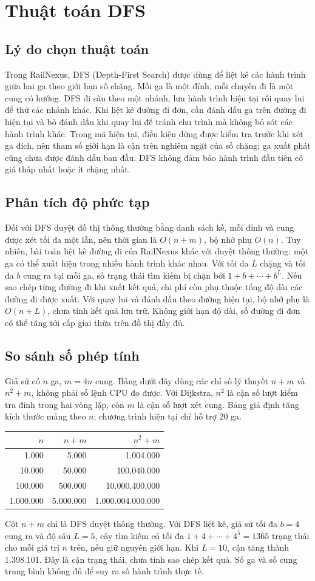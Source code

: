 \chapter{Thuật toán DFS}
\section{Lý do chọn thuật toán}
Trong RailNexus, DFS (Depth-First Search) được dùng để liệt kê các hành trình giữa hai ga theo giới hạn số chặng. Mỗi ga là một đỉnh, mỗi chuyến đi là một cung có hướng. DFS đi sâu theo một nhánh, lưu hành trình hiện tại rồi quay lui để thử các nhánh khác. Khi liệt kê đường đi đơn, cần đánh dấu ga trên đường đi hiện tại và bỏ đánh dấu khi quay lui để tránh chu trình mà không bỏ sót các hành trình khác. Trong mã hiện tại, điều kiện dừng được kiểm tra trước khi xét ga đích, nên tham số giới hạn là cận trên nghiêm ngặt của số chặng; ga xuất phát cũng chưa được đánh dấu ban đầu. DFS không đảm bảo hành trình đầu tiên có giá thấp nhất hoặc ít chặng nhất.
\section{Phân tích độ phức tạp}
Đối với DFS duyệt đồ thị thông thường bằng danh sách kề, mỗi đỉnh và cung được xét tối đa một lần, nên thời gian là $O(n+m)$, bộ nhớ phụ $O(n)$. Tuy nhiên, bài toán liệt kê đường đi của RailNexus khác với duyệt thông thường: một ga có thể xuất hiện trong nhiều hành trình khác nhau. Với tối đa $L$ chặng và tối đa $b$ cung ra tại mỗi ga, số trạng thái tìm kiếm bị chặn bởi $1+b+\cdots+b^L$. Nếu sao chép từng đường đi khi xuất kết quả, chi phí còn phụ thuộc tổng độ dài các đường đi được xuất. Với quay lui và đánh dấu theo đường hiện tại, bộ nhớ phụ là $O(n+L)$, chưa tính kết quả lưu trữ. Không giới hạn độ dài, số đường đi đơn có thể tăng tới cấp giai thừa trên đồ thị đầy đủ.
\section{So sánh số phép tính}
Giả sử có $n$ ga, $m=4n$ cung. Bảng dưới đây dùng các chỉ số lý thuyết $n+m$ và $n^2+m$, không phải số lệnh CPU đo được. Với Dijkstra, $n^2$ là cận số lượt kiểm tra đỉnh trong hai vòng lặp, còn $m$ là cận số lượt xét cung. Bảng giả định tăng kích thước mảng theo $n$; chương trình hiện tại chỉ hỗ trợ 20 ga.
\begin{center}
\begin{tabular}{r|r|r}
$n$ & $n+m$ & $n^2+m$ \\\hline
1.000 & 5.000 & 1.004.000 \\
10.000 & 50.000 & 100.040.000 \\
100.000 & 500.000 & 10.000.400.000 \\
1.000.000 & 5.000.000 & 1.000.004.000.000 \\
\end{tabular}
\end{center}
Cột $n+m$ chỉ là DFS duyệt thông thường. Với DFS liệt kê, giả sử tối đa $b=4$ cung ra và độ sâu $L=5$, cây tìm kiếm có tối đa $1+4+\cdots+4^5=1365$ trạng thái cho mỗi giá trị $n$ trên, nếu giữ nguyên giới hạn. Khi $L=10$, cận tăng thành 1.398.101. Đây là cận trạng thái, chưa tính sao chép kết quả. Số ga và số cung trung bình không đủ để suy ra số hành trình thực tế.
